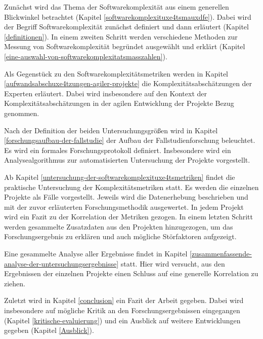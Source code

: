 Zunächst wird das Thema der Softwarekomplexität aus einem generellen
Blickwinkel betrachtet (Kapitel \ref{softwarekomplexituxe4tsmauxdfe}). Dabei wird der Begriff
Softwarekomplexität zunächst definiert und dann erläutert (Kapitel \ref{definitionen}). In einem zweiten Schritt werden verschiedene Methoden zur
Messung von Softwarekomplexität begründet ausgewählt und erklärt
(Kapitel \ref{eine-auswahl-von-softwarekomplexitatsmasszahlen}).

Als Gegenstück zu den Softwarekomplexitätsmetriken werden in Kapitel \ref{aufwandsabschuxe4tzungen-agiler-projekte}
die Komplexitätsabschätzungen der Experten erläutert. Dabei wird
insbesondere auf den Kontext der Komplexitätsabschätzungen in der agilen
Entwicklung der Projekte Bezug genommen.

Nach der Definition der beiden Untersuchungsgrö\ss en wird in Kapitel \ref{forschungsaufbau-der-fallstudie} der
Aufbau der Fallstudienforschung beleuchtet. Es wird ein formales
Forschungsprotokoll definiert. Insbesondere wird ein Analysealgorithmus
zur automatisierten Untersuchung der Projekte vorgestellt.

Ab Kapitel \ref{untersuchung-der-softwarekomplexituxe4tsmetriken} findet die praktische Untersuchung der Komplexitätsmetriken
statt. Es werden die einzelnen Projekte als Fälle vorgestellt. Jeweils
wird die Datenerhebung beschrieben und mit der zuvor erläuterten
Forschungsmethodik ausgewertet. In jedem Projekt wird ein Fazit zu der
Korrelation der Metriken gezogen. In einem letzten Schritt werden
gesammelte Zusatzdaten aus den Projekten hinzugezogen, um das
Forschungsergebnis zu erklären und auch mögliche Störfaktoren
aufgezeigt.

Eine gesammelte Analyse aller Ergebnisse findet in Kapitel \ref{zusammenfassende-analyse-der-untersuchungsergebnisse} statt. Hier
wird versucht, aus den Ergebnissen der einzelnen Projekte einen Schluss
auf eine generelle Korrelation zu ziehen.

Zuletzt wird in Kapitel \ref{conclusion} ein Fazit der Arbeit gegeben. Dabei wird
insbesondere auf mögliche Kritik an den Forschungsergebnissen
eingegangen (Kapitel \ref{kritische-evaluierung}) und ein Ausblick auf weitere Entwicklungen
gegeben (Kapitel \ref{Ausblick}).